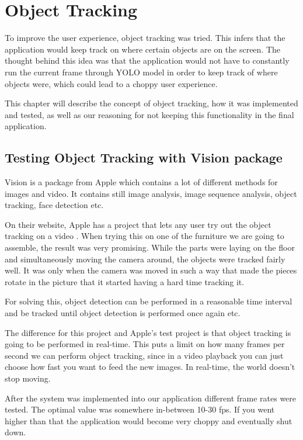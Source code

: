 \chapter{Object Tracking}
To improve the user experience, object tracking was tried. This infers that the application would keep track on where certain objects are on the screen. The thought behind this idea was that the application would not have to constantly run the current frame through YOLO model in order to keep track of where objects were, which could lead to a choppy user experience.

This chapter will describe the concept of object tracking, how it was implemented and tested, as well as our reasoning for not keeping this functionality in the final application.

\section{Testing Object Tracking with Vision package}
Vision is a package from Apple which contains a lot of different methods for images and 
video. It contains still image analysis, image sequence analysis, object tracking, face 
detection etc.

On their website, Apple has a project that lets any user try out the object tracking on a 
video \cite{ObjectTracking}. When trying this on one of the furniture we are going to assemble, the result was 
very promising. While the parts were laying on the floor and simultaneously moving the 
camera around, the objects were tracked fairly well. It was only when the camera was moved 
in such a way that made the pieces rotate in the picture that it started having a hard time 
tracking it.

For solving this, object detection can be performed in a reasonable time interval and be tracked until object detection is performed once again etc.

The difference for this project and Apple's test project is that object tracking is going to 
be performed in real-time. This puts a limit on how many frames per second we can perform 
object tracking, since in a video playback you can just choose how fast you want to feed the 
new images. In real-time, the world doesn't stop moving.

After the system was implemented into our application different frame rates were tested. The 
optimal value was somewhere in-between 10-30 fps. If you went higher than that the 
application would become very choppy and eventually shut down.

